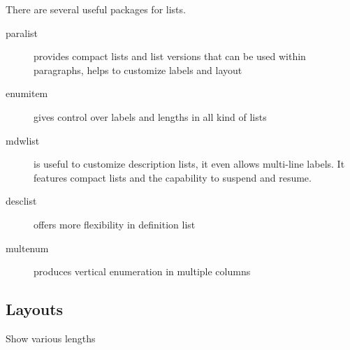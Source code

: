 \documentclass[a4paper,12pt]{article}
\begin{document}
There are several useful packages for lists.

\begin{description}
  \item[paralist] provides compact lists and list versions that
can be used within paragraphs, helps to customize labels and
layout
\item[enumitem] gives control over labels and lengths
in all kind of lists
\item[mdwlist] is useful to customize description lists, it
even allows multi-line labels. It features compact lists and
the capability to suspend and resume.
\item[desclist] offers more flexibility in definition list
\item[multenum] produces vertical enumeration in multiple
columns
\end{description}

\subsection{Layouts}

Show various lengths

\listdiagram
\end{document}
